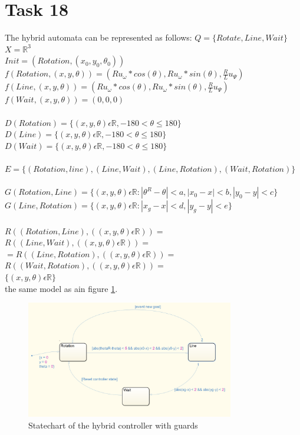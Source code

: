 \documentclass[a4paper,12pt,oneside,onecolumn]{article} %
\begin{document}
\section*{Task 18}
The hybrid automata can be represented as follows:
	$Q = \{Rotate,Line,Wait\}$\\
	$X = \mathbb{R}^3$\\
	$Init = (Rotation,(x_0,y_0,\theta_0))$
	\\
	$f(Rotation,(x,y,\theta)) = (Ru_\omega*cos(\theta),Ru_\omega*sin(\theta),\frac{R}{L}u_\Psi)$\\
	$f(Line,(x,y,\theta)) = (Ru_\omega*cos(\theta),Ru_\omega*sin(\theta),\frac{R}{L}u_\Psi)$\\
	$f(Wait,(x,y,\theta)) = (0,0,0)$\\
	\\
	$D(Rotation) = \{(x,y,\theta) \epsilon \mathbb{R}, -180 < \theta \leq 180\}$\\
	$D(Line) = \{(x,y,\theta) \epsilon \mathbb{R}, -180 < \theta \leq 180\}$\\
	$D(Wait) = \{(x,y,\theta) \epsilon \mathbb{R}, -180 < \theta \leq 180\}$\\
	\\
	$E = \{ (Rotation,line),(Line,Wait),(Line,Rotation),(Wait,Rotation)\}$\\\\
	$G(Rotation, Line) = \{(x,y,\theta) \epsilon \mathbb{R}: |\theta^R - \theta| < a, |x_0 - x| < b, |y_0 -y| < c\}$\\
	$G(Line, Rotation)=\{(x,y,\theta) \epsilon \mathbb{R}: |x_g - x|<d,|y_g -y|<e\}$\\\\	
	$R((Rotation, Line), ((x,y,\theta) \epsilon \mathbb{R}))=$ 
	$R((Line, Wait), ((x,y,\theta) \epsilon \mathbb{R}))=$\\
	$=R((Line, Rotation), ((x,y,\theta) \epsilon \mathbb{R}))=$
	$R((Wait, Rotation), ((x,y,\theta) \epsilon \mathbb{R}))=$\\$\{(x,y,\theta) \epsilon \mathbb{R}\}$\\
	
the same model as ain figure \ref{state}.
\begin{figure}[H]
\begin{center}	
  \includegraphics[width = 0.81\textwidth]{statechart.png}
  \caption{Statechart of the hybrid controller with guards}\label{state}
 \end{center}
\end{figure}
\end{document}
